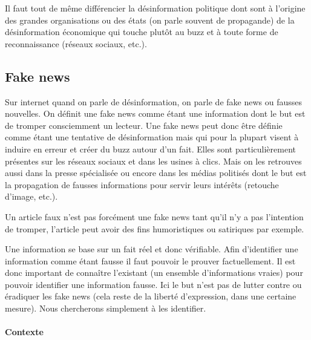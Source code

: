 Il faut tout de même différencier la désinformation politique dont sont à l'origine des grandes organisations ou des états (on parle souvent de propagande) de la désinformation économique qui touche plutôt au buzz et à toute forme de reconnaissance (réseaux sociaux, etc.).

\subsection{Fake news}

Sur internet quand on parle de désinformation, on parle de fake news ou fausses nouvelles. On définit une fake news comme étant une information dont le but est de tromper consciemment un lecteur. Une fake news peut donc être définie comme étant une tentative de désinformation mais qui pour la plupart visent à induire en erreur et créer du buzz autour d'un fait. Elles sont particulièrement présentes sur les réseaux sociaux et dans les usines à clics. Mais on les retrouves aussi dans la presse spécialisée ou encore dans les médias politisés dont le but est la propagation de fausses informations pour servir leurs intérêts (retouche d'image, etc.).  

Un article faux n'est pas forcément une fake news tant qu'il n'y a pas l'intention de tromper, l'article peut avoir des fins humoristiques ou satiriques par exemple.

Une information se base sur un fait réel et donc vérifiable. Afin d'identifier une information comme étant fausse il faut pouvoir le prouver factuellement. Il est donc important de connaître l'existant (un ensemble d'informations vraies) pour pouvoir identifier une information fausse. Ici le but n'est pas de lutter contre ou éradiquer les fake news (cela reste de la liberté d'expression, dans une certaine mesure). Nous chercherons simplement à les identifier.

\paragraph{Contexte}

